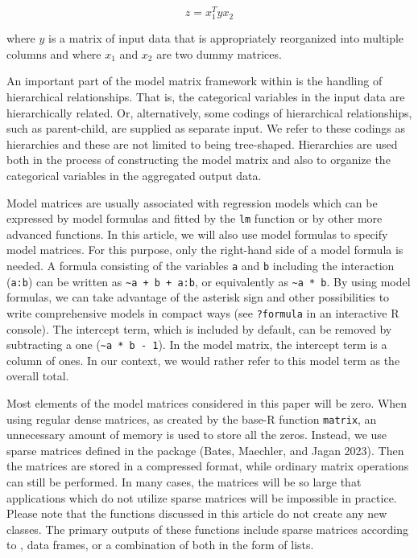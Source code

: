 \begin{equation} 
 z = x_{1}^{T}y x_{2}
   \label{eq:eq2}
\end{equation}

where \(y\) is a matrix of input data that is appropriately reorganized into multiple columns and where \(x_{1}\) and \(x_{2}\) are two dummy matrices.

An important part of the model matrix framework within  is the handling of hierarchical relationships.
That is, the categorical variables in the input data are hierarchically related.
Or, alternatively, some codings of hierarchical relationships, such as parent-child, are supplied as separate input.
We refer to these codings as hierarchies and these are not limited to being tree-shaped.
Hierarchies are used both in the process of constructing the model matrix and also to organize the categorical variables in the aggregated output data.

Model matrices are usually associated with regression models which can be expressed by model formulas and fitted by the \texttt{lm} function or by other more advanced functions.
In this article, we will also use model formulas to specify model matrices.
For this purpose, only the right-hand side of a model formula is needed.
A formula consisting of the variables \texttt{a} and \texttt{b} including the interaction (\texttt{a:b}) can be written as \texttt{\textasciitilde{}a\ +\ b\ +\ a:b}, or equivalently as \texttt{\textasciitilde{}a\ *\ b}.
By using model formulas, we can take advantage of the asterisk sign and other possibilities to write comprehensive models in compact ways (see \texttt{?formula} in an interactive R console).
The intercept term, which is included by default, can be removed by subtracting a one (\texttt{\textasciitilde{}a\ *\ b\ -\ 1}).
In the model matrix, the intercept term is a column of ones.
In our context, we would rather refer to this model term as the overall total.

Most elements of the model matrices considered in this paper will be zero.
When using regular dense matrices, as created by the base-R function \texttt{matrix}, an unnecessary amount of memory is used to store all the zeros.
Instead, we use sparse matrices defined in the  package (Bates, Maechler, and Jagan 2023).
Then the matrices are stored in a compressed format, while ordinary matrix operations can still be performed.
In many cases, the matrices will be so large that applications which do not utilize sparse matrices will be impossible in practice.
Please note that the functions discussed in this article do not create any new classes.
The primary outputs of these functions include sparse matrices according to , data frames, or a combination of both in the form of lists.

